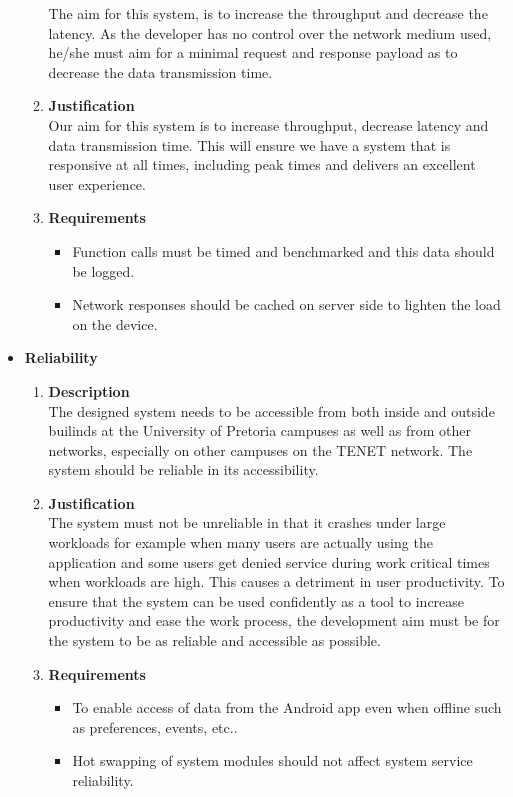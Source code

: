 \documentclass[a4paper,10pt]{article}
\begin{document}
\begin{itemize}
\begin{enumerate}
	The aim for this system, is to increase the throughput and decrease the latency. As the developer has no control over the network medium used, he/she must aim for a minimal request and response payload as to decrease the data transmission time.
\item \textbf{Justification} \\
Our aim for this system is to increase throughput, decrease latency and data transmission time. This will ensure we have a system that is responsive at all times, including peak times and delivers an excellent user experience.
\item \textbf{Requirements}
	\begin{itemize}
		\item Function calls must be timed and benchmarked and this data should be logged.
		\item Network responses should be cached on server side to lighten the load on the device.
		\end{itemize}
\end{enumerate}
\item \textbf {Reliability}
\begin{enumerate}
\item \textbf{Description} \\
The designed system needs to be accessible from both inside and outside builinds at the University of Pretoria campuses as well as from other networks, especially on other campuses on the TENET network. The system should be reliable in its accessibility.
\item \textbf{Justification} \\ 
The system must not be unreliable in that it crashes under large workloads for example when many users are actually using the application and some users get denied service during work critical times when workloads are high. This causes a detriment in user productivity. To ensure that the system can be used confidently as a tool to increase productivity and ease the work process, the development aim must be for the system to be as reliable and accessible as possible.
\item \textbf{Requirements}
	\begin{itemize}
		\item To enable access of data from the Android app even when offline such as preferences, events, etc..
		\item Hot swapping of system modules should not affect system service reliability.
	\end{itemize}

\end{enumerate}
\end{itemize}
\end{document}
